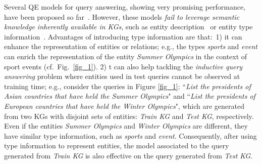   Several QE models for  query answering, showing very promising performance,  have been proposed so far~\cite{hamilton2018embedding,query2box:ren2020,ren2020beta,zhang2021cone,choudhary2021self,luus2021logic}. However, these models \textit{fail to leverage semantic knowledge inherently available in KGs}, such as entity description~\cite{yao2019kg,daza2021inductive} or entity type information~\cite{niu2020autoeter,pan2021context}. %
Advantages of introducing type information are that:~1) it can enhance the representation of entities or relations; e.g., %
the types \emph{sports}
and \emph{event} 
can enrich the representation of the entity \emph{Summer Olympics} in the context of sport events (cf.\  Fig.~\ref{fig_1}). 2) t can also  help tackling the \textit{inductive query answering} problem where entities used in  test queries cannot be observed at training time; e.g.,  %
consider the queries  in Figure \ref{fig_1}: ``\emph{List the presidents of Asian countries that have held the Summer Olympics}" and ``\emph{List the presidents of European countries that have held the Winter Olympics}", which are generated from two KGs with disjoint sets of entities: \emph{Train KG} and \emph{Test KG}, respectively. %
Even if  the entities \emph{Summer Olympics} and \emph{Winter Olympics}  are different, they have similar type information, such as \emph{sports} and \emph{event}. 
Consequently, after using type information to represent  entities, the model associated to the query generated from \emph{Train KG} is also effective on the  query generated from  \emph{Test KG}.
